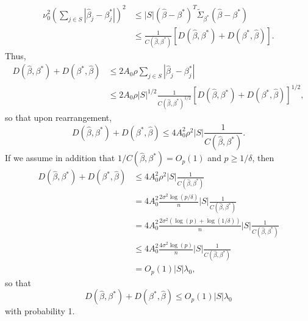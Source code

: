 \documentclass[12pt]{article}
\begin{document}
\begin{enumerate}
\begin{align*}
\nu_0^2 \left(\sum_{j \in S} |\hat{\beta}_j - \beta^*_j|\right)^2 &\leq |S| (\hat{\beta} - \beta^*)^T \widetilde{\Sigma}_{\beta^*} (\hat{\beta} - \beta^*) \\
&\leq \frac{1}{C(\hat{\beta}, \beta^*)} [D(\hat{\beta}, \beta^*) + D(\beta^*, \hat{\beta})].
\end{align*}
Thus,
\begin{align*}
D(\hat{\beta}, \beta^*) + D(\beta^*, \hat{\beta}) &\leq 2A_0 \rho \sum_{j \in S} |\hat{\beta}_j - \beta^*_j| \\
&\leq 2A_0 \rho |S|^{1/2} \frac{1}{C(\hat{\beta}, \beta^*)^{1/2}} [D(\hat{\beta}, \beta^*) + D(\beta^*, \hat{\beta})]^{1/2},
\end{align*}
so that upon rearrangement,
\begin{equation*}
D(\hat{\beta}, \beta^*) + D(\beta^*, \hat{\beta}) \leq 4A_0^2\rho^2|S| \frac{1}{C(\hat{\beta}, \beta^*)}.
\end{equation*}
If we assume in addition that $1/C(\hat{\beta}, \beta^*) = O_p(1)$ and $p \geq 1/\delta$, then
\begin{align*}
D(\hat{\beta}, \beta^*) + D(\beta^*, \hat{\beta}) &\leq 4A_0^2\rho^2|S| \frac{1}{C(\hat{\beta}, \beta^*)} \\
&= 4A_0^2 \frac{2\sigma^2\log(p / \delta)}{n} |S| \frac{1}{C(\hat{\beta}, \beta^*)} \\
&= 4A_0^2 \frac{2\sigma^2(\log(p) + \log(1/\delta))}{n} |S| \frac{1}{C(\hat{\beta}, \beta^*)} \\
&\leq 4A_0^2 \frac{4\sigma^2\log(p)}{n} |S| \frac{1}{C(\hat{\beta}, \beta^*)} \\
&= O_p(1) |S| \lambda_0,
\end{align*}
so that
\begin{equation*}
D(\hat{\beta}, \beta^*) + D(\beta^*, \hat{\beta}) \leq O_p(1) |S| \lambda_0
\end{equation*}
with probability 1.


\end{enumerate}
\end{document}
